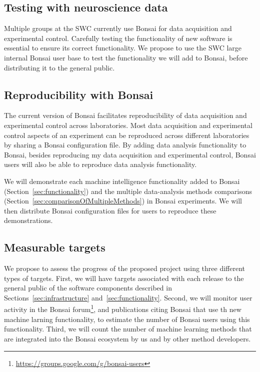 \subsection{Testing with neuroscience data}
\label{sec:testingWithNeuroscienceData}

Multiple groups at the SWC currently use Bonsai for data acquisition and
experimental control. Carefully testing the functionality of new software is
essential to ensure its correct functionality. We propose to use the SWC large
internal Bonsai user base to test the functionality we will add to Bonsai,
before distributing it to the general public.

\subsection{Reproducibility with Bonsai}
\label{sec:reproducibility}

The current version of Bonsai facilitates reproducibility of data acquisition
and experimental control across laboratories. Most data acquisition and
experimental control aspects of an experiment can be reproduced across
different laboratories by sharing a Bonsai configuration file.
%
By adding data analysis functionality to Bonsai, besides reproducing my data
acquisition and experimental control, Bonsai users will also be able to reproduce
data analysis functionality.

We will demonstrate each machine intelligence functionality added to Bonsai
(Section~\ref{sec:functionality}) and the multiple
data-analysis methods comparisons
(Section~\ref{sec:comparisonOfMultipleMethods}) in Bonsai experiments. We will
then distribute Bonsai configuration files for users to reproduce these
demonstrations.

\subsection{Measurable targets}
\label{sec:measurableTargets}

We propose to assess the progress of the proposed project using three different
types of targets.
%
First, we will have targets associated with each release to the general public
of the software components described in Sections~\ref{sec:infrastructure}
and~\ref{sec:functionality}.
%
Second, we will monitor user activity in the Bonsai
forum\footnote{\href{https://groups.google.com/g/bonsai-users}{https://groups.google.com/g/bonsai-users}},
and publications citing Bonsai that use th new machine larning functionality,
to estimate the number of Bonsai users using this functionality.
%
Third, we will count the number of machine learning methods that are integrated
into the Bonsai ecosystem by us and by other method developers.

